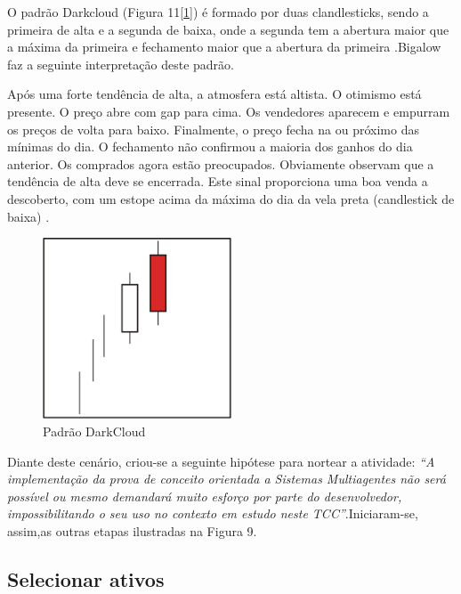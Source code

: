 O padrão Darkcloud (Figura 11[\ref{f11}]) é formado por duas clandlesticks, sendo a primeira de alta e a segunda de baixa, onde a segunda tem a abertura maior que a máxima da primeira e fechamento maior que a abertura da primeira \cite[p.61]{matsura2006}.Bigalow faz a seguinte interpretação deste padrão.

\begin{citacao}
Após uma forte tendência de alta, a atmosfera está altista. O otimismo está presente. O preço abre com gap para cima. Os vendedores aparecem e empurram os preços de volta para baixo. Finalmente, o preço fecha na ou próximo das mínimas do dia. O fechamento não confirmou a maioria dos ganhos do dia anterior. Os comprados agora estão preocupados. Obviamente observam que a tendência de alta deve se encerrada. Este sinal proporciona uma boa venda a descoberto, com um estope acima da máxima do dia da vela preta (candlestick de baixa) . \newline \cite[p.47]{bigalow2010}

\end{citacao}
\begin{figure}[h]
\centering
\label{f11}
\includegraphics[width=0.5\textwidth]{figuras/f11}
\caption{Padrão DarkCloud}

\end{figure}

Diante deste cenário, criou-se a seguinte hipótese para nortear a atividade: \textit{“A implementação da prova de conceito orientada a Sistemas Multiagentes não será possível ou mesmo demandará muito esforço por parte do desenvolvedor, impossibilitando o seu uso no contexto em estudo neste TCC”}.Iniciaram-se, assim,as outras etapas ilustradas na Figura 9.

\subsection{Selecionar ativos}

